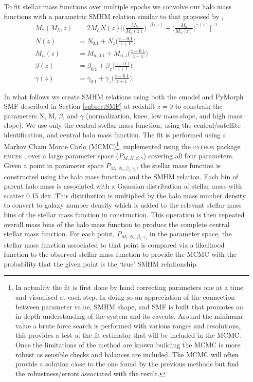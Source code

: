 To fit stellar mass functions over multiple epochs we convolve our halo mass functions with a parametric SMHM relation similar to that proposed by \cite{Moster2010},
\begin{equation}
\label{eqn:MosAbn}
\begin{split}
M_*(M_h, z) &= 2M_hN(z)\Big[ \Big( \frac{M_h}{M_{n}(z)}\Big) ^{- \beta(z)} + \Big( \frac{M_h}{M_{n}(z)}\Big)^{\gamma(z)} \Big ]^{-1}\\
N(z) &= N_{0.1} +N_z\Big(\frac{z-0.1}{z+1}\Big)\\
M_{n}(z) &= M_{n,0.1} +M_{n,z}\Big(\frac{z-0.1}{z+1}\Big)\\
\beta(z) &= \beta_{0.1} +\beta_z\Big(\frac{z-0.1}{z+1}\Big)\\
\gamma(z) &= \gamma_{0.1} +\gamma_z\Big(\frac{z-0.1}{z+1}\Big).
\end{split}
\end{equation}

In what follows we create SMHM relations using both the cmodel and PyMorph SMF described in Section \ref{subsec:SMF} at redshift $z=0$ to constrain the parameters N, M, $\beta$, and $\gamma$ (normalization, knee, low mass slope, and high mass slope). We use only the central stellar mass function, using the \cite{Yang2012EvolutionHalos} central/satellite identification, and central halo mass function. The fit is performed using a Markov Chain Monte Carlo (MCMC)\footnote{In actuality the fit is first done by hand correcting parameters one at a time and visualised at each step. In doing so an appreciation of the connection between parameter value, SMHM shape, and SMF is built that promotes an in-depth understanding of the system and its caveats. Around the minimum value a brute force search is performed with various ranges and resolutions, this provides a test of the fit estimator that will be included in the MCMC. Once the limitations of the method are known building the MCMC is more robust as sensible checks and balances are included. The MCMC will often provide a solution close to the one found by the previous methods but find the robustness/errors associated with the result.}, implemented using the \textsc{python} package \textsc{emcee} \citep{Foreman-Mackey2013Emcee:Hammer}, over a large parameter space ($P_{M, N, \beta, \gamma}$) covering all four parameters. Given a point in parameter space $P_{M_i, N_i, \beta_i, \gamma_i}$, the stellar mass function is constructed using the halo mass function and the SMHM relation. Each bin of parent halo mass is associated with a Gaussian distribution of stellar mass with scatter 0.15 dex. This distribution is multiplied by the halo mass number density to convert to galaxy number density which is added to the relevant stellar mass bins of the stellar mass function in construction. This operation is then repeated overall mass bins of the halo mass function to produce the complete central stellar mass function. For each point, $P_{M_i, N_i, \beta_i, \gamma_i}$ in the parameter space, the stellar mass function associated to that point is compared via a likelihood function to the observed stellar mass function to provide the MCMC with the probability that the given point is the `true' SMHM relationship. 

